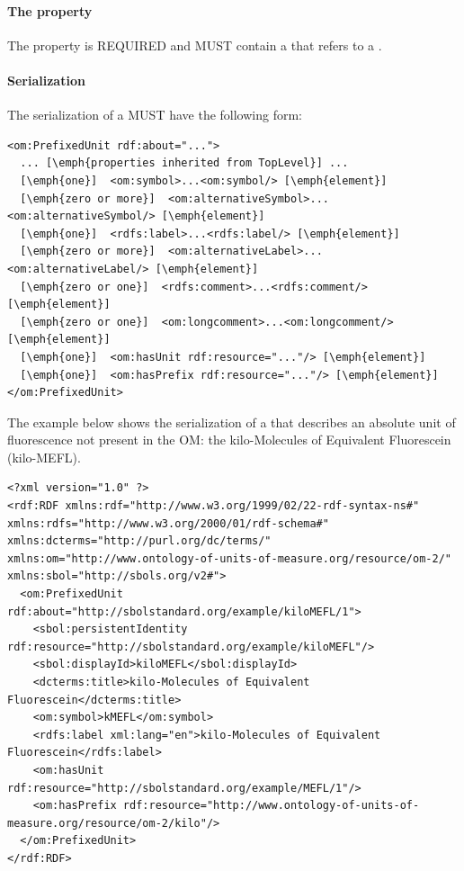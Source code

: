\paragraph{The  property}\label{sec:hasPrefix}
The  property is REQUIRED and MUST contain a  that refers to a .

\paragraph{Serialization}
The serialization of a  MUST have the following form:


\begin{lstlisting}
<om:PrefixedUnit rdf:about="...">
  ... [\emph{properties inherited from TopLevel}] ...
  [\emph{one}]  <om:symbol>...<om:symbol/> [\emph{element}]
  [\emph{zero or more}]  <om:alternativeSymbol>...<om:alternativeSymbol/> [\emph{element}]
  [\emph{one}]  <rdfs:label>...<rdfs:label/> [\emph{element}]
  [\emph{zero or more}]  <om:alternativeLabel>...<om:alternativeLabel/> [\emph{element}]
  [\emph{zero or one}]  <rdfs:comment>...<rdfs:comment/> [\emph{element}]
  [\emph{zero or one}]  <om:longcomment>...<om:longcomment/> [\emph{element}]
  [\emph{one}]  <om:hasUnit rdf:resource="..."/> [\emph{element}]
  [\emph{one}]  <om:hasPrefix rdf:resource="..."/> [\emph{element}]
</om:PrefixedUnit>
\end{lstlisting}


The example below shows the serialization of a  that describes an absolute unit of fluorescence not present in the OM: the kilo-Molecules of Equivalent Fluorescein (kilo-MEFL).

\begin{lstlisting}
<?xml version="1.0" ?>
<rdf:RDF xmlns:rdf="http://www.w3.org/1999/02/22-rdf-syntax-ns#" xmlns:rdfs="http://www.w3.org/2000/01/rdf-schema#" xmlns:dcterms="http://purl.org/dc/terms/" xmlns:om="http://www.ontology-of-units-of-measure.org/resource/om-2/" xmlns:sbol="http://sbols.org/v2#">
  <om:PrefixedUnit rdf:about="http://sbolstandard.org/example/kiloMEFL/1">
    <sbol:persistentIdentity rdf:resource="http://sbolstandard.org/example/kiloMEFL"/>
    <sbol:displayId>kiloMEFL</sbol:displayId>
    <dcterms:title>kilo-Molecules of Equivalent Fluorescein</dcterms:title>
    <om:symbol>kMEFL</om:symbol>
    <rdfs:label xml:lang="en">kilo-Molecules of Equivalent Fluorescein</rdfs:label>
    <om:hasUnit rdf:resource="http://sbolstandard.org/example/MEFL/1"/>
    <om:hasPrefix rdf:resource="http://www.ontology-of-units-of-measure.org/resource/om-2/kilo"/>
  </om:PrefixedUnit>
</rdf:RDF>
\end{lstlisting}
\label{ser:PrefixedUnit}


